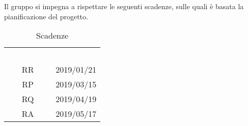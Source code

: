 Il gruppo \gruppo\space si impegna a rispettare le seguenti scadenze, sulle quali
è basata la pianificazione del progetto.

\renewcommand{\arraystretch}{1.5}
\begin{table}[H]	
	\begin{center}
	    \begin{tabular}{ c  c  }
	        \rowcolor{greySWEight}
	        \textcolor{white}{\textbf{Revisione}} & \textcolor{white}{\textbf{Scadenza}}\\
	        RR & 2019/01/21 \\
	        RP & 2019/03/15 \\
	        RQ & 2019/04/19 \\
	        RA & 2019/05/17 \\
	    \end{tabular}
	    \caption{Scadenze} \label{tab:tabellascadenze} 
	\end{center}
\end{table}

   
